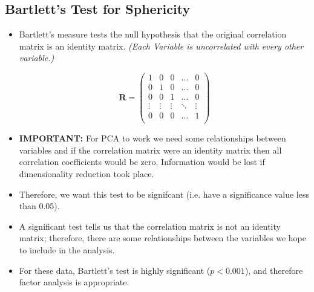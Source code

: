 \documentclass[a4paper,12pt]{article}
\begin{document}
\subsection{Bartlett's Test for Sphericity}
\begin{itemize}
	\item
Bartlett's measure tests the null hypothesis that the original correlation matrix is an identity
matrix. \textit{(Each Variable is uncorrelated with every other variable.)}

\[
\textbf{R} = \left( \begin{array}{ccccc}
 1 & 0 & 0 & \ldots & 0 \\ 
 0 & 1 & 0 & \ldots & 0 \\ 
 0 & 0 & 1 & \ldots & 0 \\ 
 \vdots  & \vdots & \vdots & \ddots & \vdots \\ 
 0 & 0 & 0 & \ldots & 1 \\ 
\end{array} \right)
\]  
\item \textbf{IMPORTANT:} For PCA to work we need some relationships between variables and if the correlation
matrix were an identity matrix then all correlation coefficients would be zero. Information would be lost if dimensionality reduction took place.

\item Therefore, we
want this test to be signifcant (i.e. have a significance value less than 0.05). 
\item A significant test
tells us that the correlation matrix is not an identity matrix; therefore, there are some relationships
between the variables we hope to include in the analysis. 
\item For these data, Bartlett's test is
highly significant ($p < 0.001$), and therefore factor analysis is appropriate.
\end{itemize}
\end{document}
